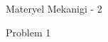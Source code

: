 \documentclass[12pt,fleqn]{article}\usepackage{../../common}
\begin{document}
Materyel Mekanigi - 2

Problem 1
\end{document}
